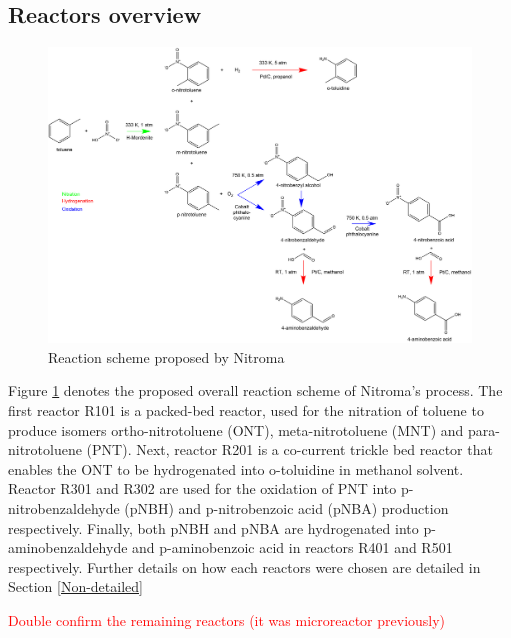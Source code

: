 \subsection{Reactors overview}
\begin{figure}[h]
    \centering
    \includegraphics[width=\linewidth]{chapters/2-reaction/figures/routes-chosen_20210220.png}
    \caption{Reaction scheme proposed by Nitroma}
    \label{fig:finalroutes}
\end{figure}
Figure \ref{fig:finalroutes} denotes the proposed overall reaction scheme of Nitroma's process. The first reactor R101 is a packed-bed reactor, used for the nitration of toluene to produce isomers ortho-nitrotoluene (ONT), meta-nitrotoluene (MNT) and para-nitrotoluene (PNT). Next, reactor R201 is a co-current trickle bed reactor that enables the ONT to be hydrogenated into o-toluidine in methanol solvent. Reactor R301 and R302 are used for the oxidation of PNT into p-nitrobenzaldehyde (pNBH) and p-nitrobenzoic acid (pNBA) production respectively. Finally, both pNBH and pNBA are hydrogenated into p-aminobenzaldehyde and p-aminobenzoic acid in reactors R401 and R501 respectively. Further details on how each reactors were chosen are detailed in Section \ref{Non-detailed}



\textcolor{red}{Double confirm the remaining reactors (it was microreactor previously)} 




